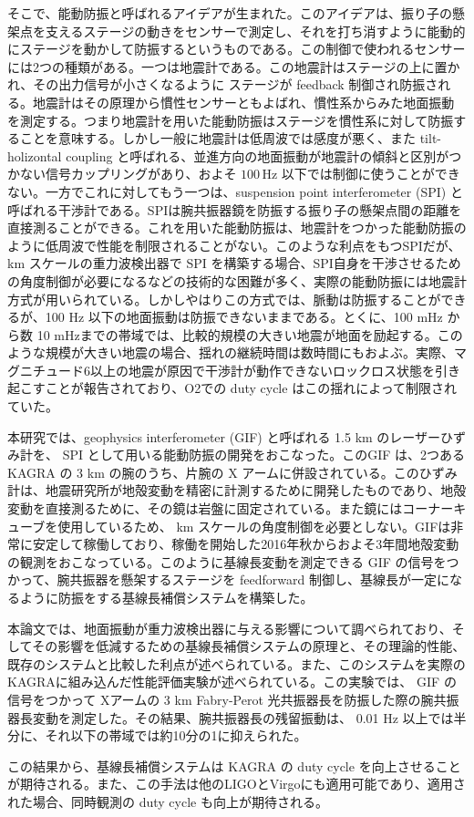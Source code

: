 そこで、能動防振と呼ばれるアイデアが生まれた。このアイデアは、振り子の懸架点を支えるステージの動きをセンサーで測定し、それを打ち消すように能動的にステージを動かして防振するというものである。この制御で使われるセンサーには2つの種類がある。一つは地震計である。この地震計はステージの上に置かれ、その出力信号が小さくなるように ステージが feedback 制御され防振される。地震計はその原理から慣性センサーともよばれ、慣性系からみた地面振動を測定する。つまり地震計を用いた能動防振はステージを慣性系に対して防振することを意味する。しかし一般に地震計は低周波では感度が悪く、また tilt-holizontal coupling と呼ばれる、並進方向の地面振動が地震計の傾斜と区別がつかない信号カップリングがあり、およそ $100\,\mathrm{Hz}$ 以下では制御に使うことができない。一方でこれに対してもう一つは、suspension point interferometer (SPI) と呼ばれる干渉計である。SPIは腕共振器鏡を防振する振り子の懸架点間の距離を直接測ることができる。これを用いた能動防振は、地震計をつかった能動防振のように低周波で性能を制限されることがない。このような利点をもつSPIだが、km スケールの重力波検出器で SPI を構築する場合、SPI自身を干渉させるための角度制御が必要になるなどの技術的な困難が多く、実際の能動防振には地震計方式が用いられている。しかしやはりこの方式では、脈動は防振することができるが、100 Hz 以下の地面振動は防振できないままである。とくに、100 mHz から数 10 $\mathrm{mHz}$までの帯域では、比較的規模の大きい地震が地面を励起する。このような規模が大きい地震の場合、揺れの継続時間は数時間にもおよぶ。実際、マグニチュード6以上の地震が原因で干渉計が動作できないロックロス状態を引き起こすことが報告されており、O2での duty cycle はこの揺れによって制限されていた。

本研究では、geophysics interferometer (GIF) と呼ばれる 1.5 km のレーザーひずみ計を、 SPI として用いる能動防振の開発をおこなった。このGIF は、2つある KAGRA の 3 km の腕のうち、片腕の X アームに併設されている。このひずみ計は、地震研究所が地殻変動を精密に計測するために開発したものであり、地殻変動を直接測るために、その鏡は岩盤に固定されている。また鏡にはコーナーキューブを使用しているため、 km スケールの角度制御を必要としない。GIFは非常に安定して稼働しており、稼働を開始した2016年秋からおよそ3年間地殻変動の観測をおこなっている。このように基線長変動を測定できる GIF の信号をつかって、腕共振器を懸架するステージを feedforward 制御し、基線長が一定になるように防振をする基線長補償システムを構築した。

本論文では、地面振動が重力波検出器に与える影響について調べられており、そしてその影響を低減するための基線長補償システムの原理と、その理論的性能、既存のシステムと比較した利点が述べられている。また、このシステムを実際のKAGRAに組み込んだ性能評価実験が述べられている。この実験では、 GIF の信号をつかって Xアームの 3 km Fabry-Perot 光共振器長を防振した際の腕共振器長変動を測定した。その結果、腕共振器長の残留振動は、 0.01 Hz 以上では半分に、それ以下の帯域では約10分の1に抑えられた。

この結果から、基線長補償システムは KAGRA の duty cycle を向上させることが期待される。また、この手法は他のLIGOとVirgoにも適用可能であり、適用された場合、同時観測の duty cycle も向上が期待される。
